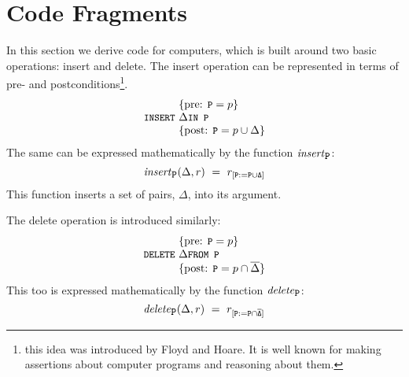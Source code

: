 \documentclass[11pt,a4paper,fleqn,oneside]{article}
\newcommand{\subst}[3]{#3_{\tt [#1 := #2]}}
\newcommand{\code}[1]{\text{\tt\small #1}}
\def\id#1{\text{\em #1\/}}
\newcommand{\cmpl}[1]{\overline{#1}}
\begin{document}
\section{Code Fragments}
	In this section we derive code for computers,
	which is built around two basic operations: insert and delete.
	The insert operation can be represented in terms of pre- and postconditions\footnote{this idea
	was introduced by Floyd and Hoare.
	It is well known for making assertions about computer programs and reasoning about them.}.
\[\begin{array}{r@{~}l}
&\{\text{pre: $\code{P}=p$}\}\\
\code{INSERT}&\Delta\code{ IN P}\\
&\{\text{post: $\code{P}=p\cup\Delta$}\}\\
\end{array}\]
	The same can be expressed mathematically by the function $\id{insert}_\code{P}$:
\begin{equation}
\id{insert}_\code{P}(\Delta,r)\ =\ \subst{P}{P\cup\Delta}{r}
\end{equation}
	This function inserts a set of pairs, $\Delta$, into its argument.

	The delete operation is introduced similarly:
\[\begin{array}{r@{~}l}
&\{\text{pre: $\code{P}=p$}\}\\
\code{DELETE}&\Delta\code{ FROM P}\\
&\{\text{post: $\code{P}=p\cap\cmpl{\Delta}$}\}\\
\end{array}\]
	This too is expressed mathematically by the function $\id{delete}_\code{P}$:
\begin{equation}
\id{delete}_\code{P}(\Delta,r)\ =\ \subst{P}{P\cap\cmpl{\Delta}}{r}
\end{equation}
	
\end{document}
